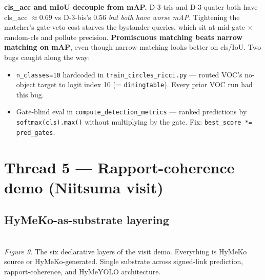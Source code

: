 \documentclass[11pt,a4paper]{article}
\newcommand{\HyMeKo}{\textsc{HyMeKo}}
\newcommand{\code}[1]{\texttt{\small #1}}
\begin{document}
\textbf{cls\_acc and mIoU decouple from mAP.} D-3-tris and D-3-quater
both have cls\_acc ${\approx} 0.69$ vs D-3-bis's $0.56$ \emph{but both
have worse mAP}. Tightening the matcher's gate-veto cost starves the
bystander queries, which sit at mid-gate $\times$ random-cls and pollute
precision. \textbf{Promiscuous matching beats narrow matching on mAP},
even though narrow matching looks better on cls/IoU. Two bugs caught
along the way:

\begin{itemize}
  \item \texttt{n\_classes{=}10} hardcoded in
        \code{train\_circles\_ricci.py} --- routed VOC's no-object
        target to logit index 10 (= \texttt{diningtable}). Every
        prior VOC run had this bug.
  \item Gate-blind eval in \code{compute\_detection\_metrics} ---
        ranked predictions by \code{softmax(cls).max()} without
        multiplying by the gate. Fix: \code{best\_score *= pred\_gates}.
\end{itemize}

\section{Thread 5 --- Rapport-coherence demo (Niitsuma visit)}

\subsection{HyMeKo-as-substrate layering}

\begin{center}
\\
\small\textit{Figure 9.} The six declarative layers of the visit demo. Everything is HyMeKo source
or HyMeKo-generated. Single substrate across signed-link prediction, rapport-coherence,
and HyMeYOLO architecture.
\end{center}
\end{document}
